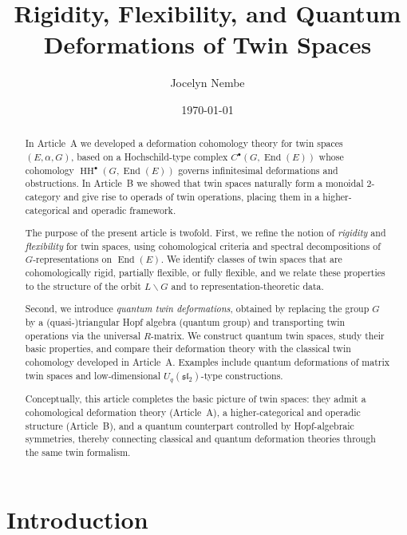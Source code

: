 \documentclass[11pt,a4paper]{article}
\title{\textbf{Rigidity, Flexibility, and Quantum Deformations of Twin Spaces}}
\author{Jocelyn Nembe}
\date{\today}
\numberwithin{equation}{section}
\DeclareMathOperator{\End}{End}
\DeclareMathOperator{\HH}{HH}
\newcommand{\TwinSpace}{(E,\alpha,G)}
\newcommand{\LinearSubgroup}{L}
\newcommand{\Cochain}{C}
\begin{document}
	
	\maketitle
	
	\begin{abstract}
		In Article~A we developed a deformation cohomology theory for twin spaces $\TwinSpace$,
		based on a Hochschild-type complex $\Cochain^\bullet(G,\End(E))$ whose cohomology 
		$\HH^\bullet(G,\End(E))$ governs infinitesimal deformations and obstructions.
		In Article~B we showed that twin spaces naturally form a monoidal 2-category and give rise
		to operads of twin operations, placing them in a higher-categorical and operadic framework.
		
		The purpose of the present article is twofold.
		First, we refine the notion of \emph{rigidity} and \emph{flexibility} for twin spaces, using 
		cohomological criteria and spectral decompositions of $G$-representations on $\End(E)$.
		We identify classes of twin spaces that are cohomologically rigid, partially flexible, or 
		fully flexible, and we relate these properties to the structure of the orbit $\LinearSubgroup\backslash G$ 
		and to representation-theoretic data.
		
		Second, we introduce \emph{quantum twin deformations}, obtained by replacing the group $G$ by 
		a (quasi-)triangular Hopf algebra (quantum group) and transporting twin operations via the 
		universal $R$-matrix. We construct quantum twin spaces, study their basic properties, and 
		compare their deformation theory with the classical twin cohomology developed in Article~A.
		Examples include quantum deformations of matrix twin spaces and low-dimensional 
		$U_q(\mathfrak{sl}_2)$-type constructions.
		
		Conceptually, this article completes the basic picture of twin spaces: they admit a 
		cohomological deformation theory (Article~A), a higher-categorical and operadic structure
		(Article~B), and a quantum counterpart controlled by Hopf-algebraic symmetries, thereby
		connecting classical and quantum deformation theories through the same twin formalism.
	\end{abstract}
	
	\tableofcontents
	
	\section{Introduction}
	\label{sec:intro}
	
\end{document}
